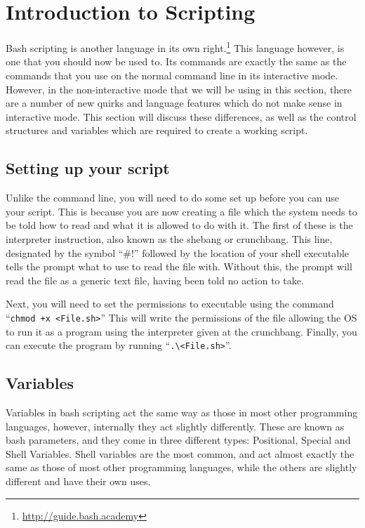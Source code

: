 \documentclass[a4paper,11pt]{report}
\begin{document}
	\section{Introduction to Scripting}
		Bash scripting is another language in its own right.\footnote{\url{http://guide.bash.academy}}
		This language however, is one that you should now be used to. 
		Its commands are exactly the same as the commands that you use on the normal command line in its interactive mode. 
		However, in the non-interactive mode that we will be using in this section, there are a number of new quirks and language features which do not make sense in interactive mode. 
		This section will discuss these differences, as well as the control structures and variables which are required to create a working script. 
		\subsection{Setting up your script}
			Unlike the command line, you will need to do some set up before you can use your script. 
			This is because you are now creating a file which the system needs to be told how to read and what it is allowed to do with it. 
			The first of these is the interpreter instruction, also known as the shebang or crunchbang. 
			This line, designated by the symbol ``\#!'' followed by the location of your shell executable tells the prompt what to use to read the file with. 
			Without this, the prompt will read the file as a generic text file, having been told no action to take. 

			Next, you will need to set the permissions to executable using the command ``\verb|chmod +x <File.sh>|''
			This will write the permissions of the file allowing the OS to run it as a program using the interpreter given at the crunchbang. 
			Finally, you can execute the program by running ``\verb+.\<File.sh>+''. 
		\subsection{Variables}
			Variables in bash scripting act the same way as those in most other programming languages, however, internally they act slightly differently. 
			These are known as bash parameters, and they come in three different types: Positional, Special and Shell Variables. 
			Shell variables are the most common, and act almost exactly the same as those of most other programming languages, while the others are slightly different and have their own uses. 
\end{document}
